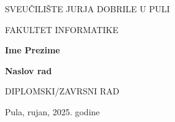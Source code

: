 \begin{center}
SVEUČILIŠTE JURJA DOBRILE U PULI 

FAKULTET INFORMATIKE

\vspace{45mm} 

\textbf{Ime Prezime}

\vspace{20mm} 

\textbf{Naslov rad}

\vspace{5mm}
DIPLOMSKI/ZAVRSNI RAD

\vfill

Pula, rujan, 2025. godine
\end{center}
